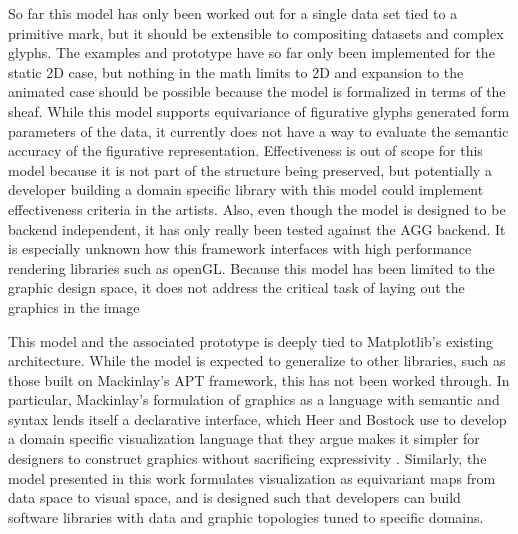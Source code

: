 \documentclass[../main.tex]{subfiles}
\begin{document}
So far this model has only been worked out for a single data set tied to a primitive mark, but it should be extensible to compositing datasets and complex glyphs. The examples and prototype have so far only been implemented for the static 2D case, but nothing in the math limits to 2D and expansion to the animated case should be possible because the model is formalized in terms of the sheaf. While this model supports equivariance of figurative glyphs generated form parameters of the data\cite{beckfeathers2014,byrneFigurativeFramesCritical2017}, it currently does not have a way to evaluate the semantic accuracy of the figurative representation. Effectiveness is out of scope for this model because it is not part of the structure being preserved, but potentially a developer building a domain specific library with this model could implement effectiveness criteria in the artists. Also, even though the model is designed to be backend independent, it has only really been tested against the AGG backend. It is especially unknown how this framework interfaces with high performance rendering libraries such as openGL\cite{CarsonOpenGL1997}.  Because this model has been limited to the graphic design space, it does not address the critical task of laying out the graphics in the image

This model and the associated prototype is deeply tied to Matplotlib's existing architecture. While the model is expected to generalize to other libraries, such as those built on Mackinlay's APT framework, this has not been worked through. In particular, Mackinlay's formulation of graphics as a language with semantic and syntax lends itself a declarative interface\cite{loudenProgrammingLanguagesPrinciples2010}, which Heer and Bostock use to develop a domain specific visualization language that they argue makes it simpler for designers to construct graphics without sacrificing expressivity \cite{heerDeclarative2010}. Similarly, the model presented in this work formulates visualization as equivariant maps from data space to visual space, and is designed such that developers can build software libraries with data and graphic topologies tuned to specific domains. 
\end{document}
